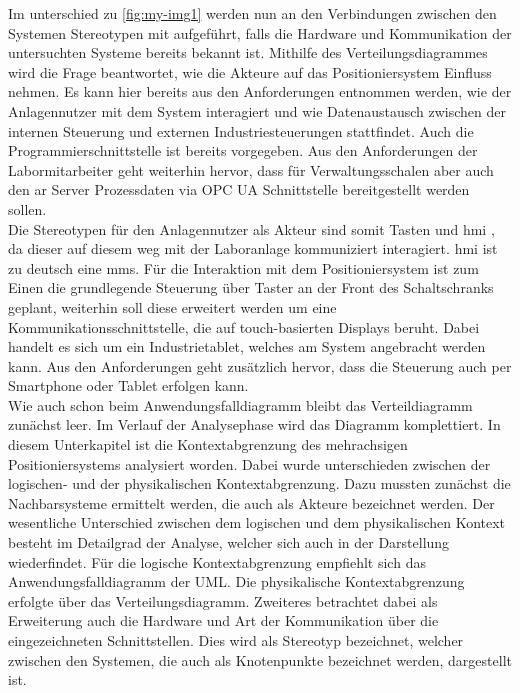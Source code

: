 \documentclass[../../../Bachelorarbeit.tex]{subfiles}
\begin{document}
Im unterschied zu \autoref{fig:my-img1} werden nun an den Verbindungen zwischen den Systemen Stereotypen mit aufgeführt, falls die Hardware und Kommunikation der untersuchten Systeme bereits bekannt ist. Mithilfe des Verteilungsdiagrammes wird die Frage beantwortet, wie die Akteure auf das Positioniersystem Einfluss nehmen. Es kann hier bereits aus den Anforderungen entnommen werden, wie der Anlagennutzer mit dem System interagiert und wie Datenaustausch zwischen der internen Steuerung und externen Industriesteuerungen stattfindet. Auch die Programmierschnittstelle ist bereits vorgegeben. Aus den Anforderungen der Labormitarbeiter geht weiterhin hervor, dass für Verwaltungsschalen aber auch den \ac{ar} Server Prozessdaten via OPC UA Schnittstelle bereitgestellt werden sollen.\\
Die Stereotypen für \zB den Anlagennutzer als Akteur sind somit \glqq Tasten\grqq{} und \glqq \acs{hmi} \grqq{}, da dieser auf diesem weg mit der Laboranlage kommuniziert \bzw interagiert. \ac{hmi} ist zu deutsch eine \ac{mms}. Für die Interaktion mit dem Positioniersystem ist zum Einen die grundlegende Steuerung über Taster an der Front des Schaltschranks geplant, weiterhin soll diese erweitert werden um eine Kommunikationsschnittstelle, die auf touch-basierten Displays beruht. Dabei handelt es sich um ein Industrietablet, welches am System angebracht werden kann. Aus den Anforderungen geht zusätzlich hervor, dass die Steuerung auch per Smartphone oder Tablet erfolgen kann.\\
Wie auch schon beim Anwendungsfalldiagramm bleibt das Verteildiagramm zunächst leer. Im Verlauf der Analysephase wird das Diagramm komplettiert.
\bigskip
\newline
In diesem Unterkapitel ist die Kontextabgrenzung des mehrachsigen Positioniersystems analysiert worden. Dabei wurde unterschieden zwischen der logischen- und der physikalischen Kontextabgrenzung. Dazu mussten zunächst die Nachbarsysteme ermittelt werden, die auch als Akteure bezeichnet werden. Der wesentliche Unterschied zwischen dem logischen und dem physikalischen Kontext besteht im Detailgrad der Analyse, welcher sich auch in der Darstellung wiederfindet. Für die logische Kontextabgrenzung empfiehlt sich das Anwendungsfalldiagramm der UML. Die physikalische Kontextabgrenzung erfolgte über das Verteilungsdiagramm. Zweiteres betrachtet dabei als Erweiterung auch die Hardware und Art der Kommunikation über die eingezeichneten Schnittstellen. Dies wird als Stereotyp bezeichnet, welcher zwischen den Systemen, die auch als Knotenpunkte bezeichnet werden, dargestellt ist.
\end{document}

